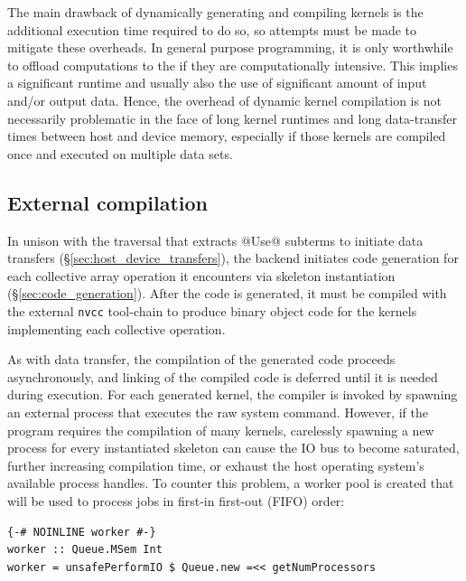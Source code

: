 The main drawback of dynamically generating and compiling \GPU kernels is the
additional execution time required to do so, so attempts must be made to
mitigate these overheads. In general purpose \GPU programming, it is only
worthwhile to offload computations to the \GPU if they are computationally
intensive. This implies a significant runtime and usually also the use of
significant amount of input and/or output data. Hence, the overhead of dynamic
kernel compilation is not necessarily problematic in the face of long kernel
runtimes and long data-transfer times between host and device memory, especially
if those kernels are compiled once and executed on multiple data sets.

\subsection{External compilation}
\label{sec:external_compilation}

In unison with the \AST traversal that extracts @Use@ subterms to initiate
data transfers (\S\ref{sec:host_device_transfers}), the \CUDA backend initiates
code generation for each collective array operation it encounters via skeleton
instantiation (\S\ref{sec:code_generation}). After the \CUDA code is generated,
it must be compiled with the external \texttt{nvcc} tool-chain to produce binary
object code for the kernels implementing each collective operation.

As with data transfer, the compilation of the generated \CUDA code proceeds
asynchronously, and linking of the compiled code is deferred until it is needed
during execution. For each generated kernel, the \CUDA compiler is invoked by
spawning an external process that executes the raw system command. However, if
the program requires the compilation of many kernels, carelessly spawning a new
process for every instantiated skeleton can cause the IO bus to become
saturated, further increasing compilation time, or exhaust the host operating
system's available process handles. To counter this problem, a worker pool is
created that will be used to process jobs in first-in first-out (FIFO) order:
%
\begin{lstlisting}[style=haskell]
{-# NOINLINE worker #-}
worker :: Queue.MSem Int
worker = unsafePerformIO $ Queue.new =<< getNumProcessors
\end{lstlisting}

